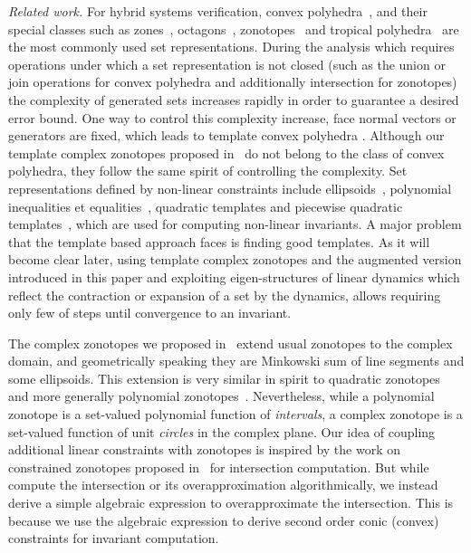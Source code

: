 

\emph{Related work.} For hybrid systems verification, convex polyhedra~\cite{CousotHalbwachs78,jeannet2009apron}, and their special classes such as
zones~\cite{DBLP:conf/pado/Mine01},
octagons~\cite{DBLP:journals/lisp/Mine06}, zonotopes~\cite{DBLP:conf/hybrid/Girard05,DBLP:conf/eucc/MaigaCRT14} and
tropical polyhedra~\cite{DBLP:conf/sas/AllamigeonGG08} are the most
commonly used set representations. During the analysis which requires
operations under which a set representation is not closed (such as the
union or join operations for convex polyhedra and additionally
intersection for zonotopes) the complexity of generated sets increases
rapidly in order to guarantee a desired error bound. One way to
control this complexity increase, face normal vectors or generators
are fixed, which leads to template convex
polyhedra \cite{Sankaranarayanan+Dang+Ivancic-08-Symbolic,DBLP:conf/aplas/DangG11}. Although
our template complex zonotopes proposed in~\cite{tcz2017} do not
belong to the class of convex polyhedra, they follow the same
spirit of controlling the complexity. Set representations defined by non-linear constraints include
ellipsoids~\cite{Kurzhanski2000201}, polynomial
inequalities\cite{DBLP:conf/sas/BagnaraRZ05} et
equalities~\cite{Rodriguez-Carbonell:2007}, quadratic templates and
piecewise quadratic
templates~\cite{DBLP:conf/esop/AdjeGG10,DBLP:conf/hybrid/RouxJGF12,DBLP:conf/fm/RouxG14,DBLP:conf/hybrid/Adje17},
which are used for computing non-linear invariants. A major problem
that the template based approach faces is finding good templates. As
it will become clear later, using template complex zonotopes and the
augmented version introduced in this paper and exploiting
eigen-structures of linear dynamics which reflect the contraction or
expansion of a set by the dynamics, allows requiring only few of steps
until convergence to an invariant.

The complex zonotopes we proposed in~\cite{adimoolamACC2016} extend
usual zonotopes to the complex domain, and geometrically speaking they
are Minkowski sum of line segments and some ellipsoids. This extension
is very similar in spirit to quadratic
zonotopes~\cite{DBLP:conf/aplas/AdjeGW15} and more generally
polynomial zonotopes~\cite{DBLP:conf/hybrid/Althoff13}. Nevertheless,
while a polynomial zonotope is a set-valued polynomial function
of \emph{intervals}, a complex zonotope is a set-valued function of
unit \emph{circles} in the complex plane. Our idea of coupling
additional linear constraints with zonotopes is inspired by the work
on constrained zonotopes proposed
in~\cite{DBLP:conf/cav/GhorbalGP09,scott2016constrained} for
intersection computation.  But
while~\cite{DBLP:conf/cav/GhorbalGP09,scott2016constrained} compute
the intersection or its overapproximation algorithmically, we instead
derive a simple algebraic expression to overapproximate the
intersection.  This is because we use the algebraic expression to
derive second order conic (convex) constraints for invariant computation.\\

